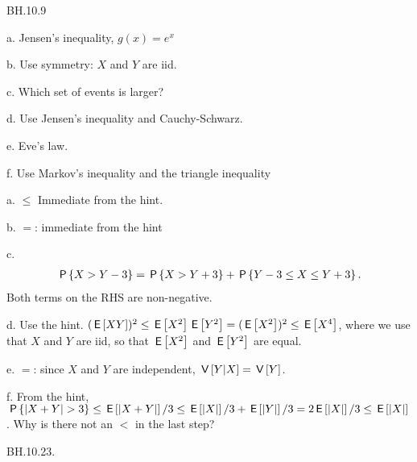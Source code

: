 \setcounter{theorem}{8}
\begin{exercise}
BH.10.9
\begin{hint}
a. Jensen's inequality, $g(x)=e^x$

b. Use symmetry: $X$ and $Y$ are iid.

c. Which set of events is larger?

d.
Use Jensen's inequality and Cauchy-Schwarz.

e. Eve's law.

f. Use Markov's inequality and  the triangle inequality
\end{hint}
\begin{solution}
a. $\leq$ Immediate from the hint.

b. $=$: immediate from the hint

c.
\begin{align*}
\P{X>Y-3} =  \P{X>Y+3} + \P{Y-3\leq X \leq Y+3}.
\end{align*}
Both terms on the RHS are non-negative.

d. Use the hint. $(\E{XY})^{2} \leq \E{X^2}\E{Y^2} =(\E{X^2})^{2} \leq \E{X^4}$, where we use that  $X$ and $Y$ are iid, so that $\E{X^2}$ and $\E{Y^2}$ are equal.

e. $=$: since $X$ and $Y$ are independent, $\V{Y|X} = \V Y$.

f. From the hint,  $\P{|X+Y|>3} \leq \E{|X+Y|}/3 \leq \E{|X|}/3 + \E{|Y|}/3 = 2\E{|X|}/3 \leq \E{|X|}$. Why is there not an $<$ in the last step?
\end{solution}
\end{exercise}


\setcounter{theorem}{22}
\begin{exercise}
BH.10.23.
\end{exercise}

